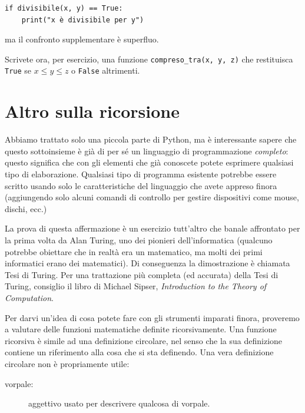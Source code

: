 \documentclass[10pt]{book}
\begin{document}
\begin{verbatim}
if divisibile(x, y) == True:
    print("x è divisibile per y")
\end{verbatim}
%
ma il confronto supplementare è superfluo.

Scrivete ora, per esercizio, una funzione \verb"compreso_tra(x, y, z)" che restituisca {\tt True} se $x \le y \le z$ o {\tt False} altrimenti.


\section{Altro sulla ricorsione}
\label{more.recursion}

Abbiamo trattato solo una piccola parte di Python, ma è interessante sapere che questo sottoinsieme è già di per sé un linguaggio di programmazione {\em completo}: questo significa che con gli elementi che già conoscete potete esprimere qualsiasi tipo di elaborazione. Qualsiasi tipo di programma esistente potrebbe essere scritto usando solo le caratteristiche del linguaggio che avete appreso finora (aggiungendo solo alcuni comandi di controllo per gestire dispositivi come mouse, dischi, ecc.)

La prova di questa affermazione è un esercizio tutt'altro che banale affrontato per la prima volta da Alan Turing, uno dei pionieri dell'informatica (qualcuno potrebbe obiettare che in realtà era un matematico, ma molti dei primi informatici erano dei matematici). Di conseguenza la dimostrazione è chiamata Tesi di Turing.
Per una trattazione più completa (ed accurata) della Tesi di Turing, consiglio il libro di Michael Sipser, {\em Introduction to the Theory of Computation}.

Per darvi un'idea di cosa potete fare con gli strumenti imparati finora, proveremo a valutare delle funzioni matematiche definite ricorsivamente. Una funzione ricorsiva è simile ad una definizione circolare, nel senso che la sua definizione contiene un riferimento alla cosa che si sta definendo. Una vera definizione circolare non è propriamente utile:

\begin{description}

\item[vorpale:] aggettivo usato per descrivere qualcosa di vorpale.

\end{description}
\end{document}
